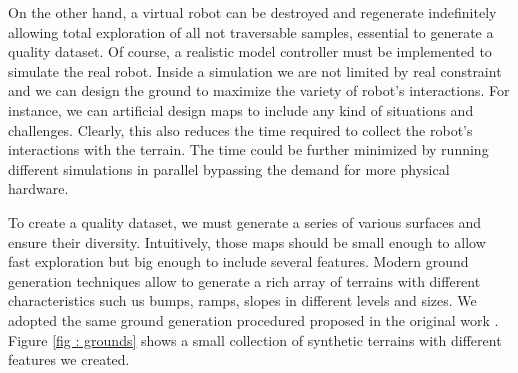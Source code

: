 \documentclass[../document.tex]{subfiles}
\begin{document}
On the other hand, a virtual robot can be destroyed and regenerate indefinitely allowing total exploration of all not traversable samples, essential to generate a quality dataset. Of course, a realistic model controller must be implemented to simulate the real robot. Inside a simulation we are not limited by real constraint and we can design the ground to maximize the variety of robot's interactions. For instance, we can artificial design maps to include any kind of situations and challenges.
Clearly, this also reduces the time required to collect the robot's interactions with the terrain. The time could be further minimized by running different simulations in parallel bypassing the demand for more physical hardware.

To create a quality dataset, we must generate a series of various surfaces and ensure their diversity.
Intuitively, those maps should be small enough to allow fast exploration but big enough to include several features. Modern ground generation techniques allow to generate a rich array of terrains with different characteristics such us bumps, ramps, slopes in different levels and sizes. We adopted the same ground generation procedured proposed in the original work \cite{omar2018traversability}. Figure \ref{fig : grounds} shows a small collection of synthetic terrains with different features we created.
\end{document}
